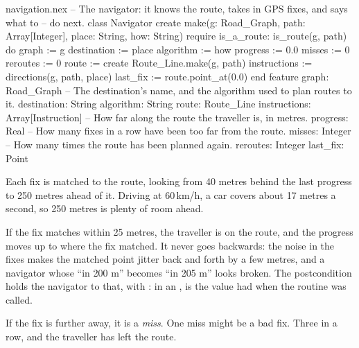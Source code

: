 \begin{append}{navigation.nex}
-- The navigator: it knows the route, takes in GPS fixes, and says what to
-- do next.
class Navigator
create
  make(g: Road_Graph, path: Array[Integer], place: String, how: String)
  require
    is_a_route: is_route(g, path)
  do
    graph := g
    destination := place
    algorithm := how
    progress := 0.0
    misses := 0
    reroutes := 0
    route := create Route_Line.make(g, path)
    instructions := directions(g, path, place)
    last_fix := route.point_at(0.0)
  end
feature
  graph: Road_Graph
  -- The destination's name, and the algorithm used to plan routes to it.
  destination: String
  algorithm: String
  route: Route_Line
  instructions: Array[Instruction]
  -- How far along the route the traveller is, in metres.
  progress: Real
  -- How many fixes in a row have been too far from the route.
  misses: Integer
  -- How many times the route has been planned again.
  reroutes: Integer
  last_fix: Point
\end{append}

Each fix is matched to the route, looking from 40 metres behind the last
progress to 250 metres ahead of it. Driving at 60\,km/h, a car covers about
17 metres a second, so 250 metres is plenty of room ahead.

If the fix matches within 25 metres, the traveller is on the route, and
the progress moves up to where the fix matched. It never goes backwards:
the noise in the fixes makes the matched point jitter back and forth by a
few metres, and a navigator whose ``in 200 m'' becomes ``in 205 m'' looks
broken. The postcondition holds the navigator to that, with :
in an ,  is the value  had
when the routine was called.

If the fix is further away, it is a \emph{miss}. One miss might be a bad
fix. Three in a row, and the traveller has left the route.

